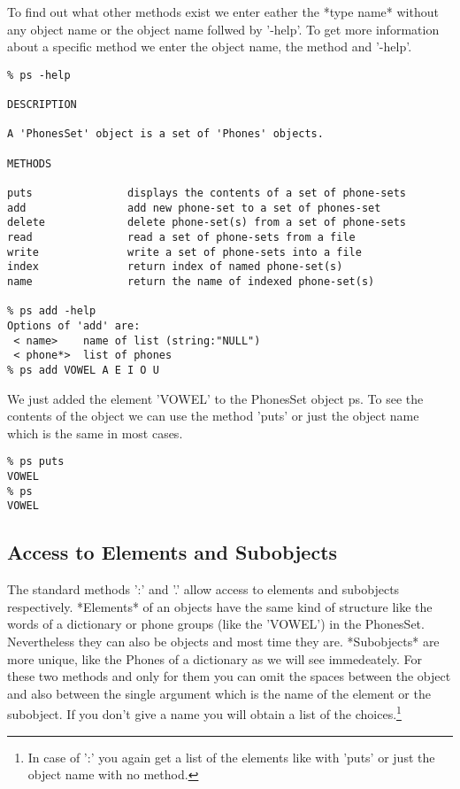 To find out what other methods exist we enter eather the *type name*
without any object name or the object name follwed by '-help'. To get
more information about a specific method we enter the object name, the
method and '-help'.

\begin{verbatim}
% ps -help

DESCRIPTION

A 'PhonesSet' object is a set of 'Phones' objects.

METHODS

puts               displays the contents of a set of phone-sets
add                add new phone-set to a set of phones-set
delete             delete phone-set(s) from a set of phone-sets
read               read a set of phone-sets from a file
write              write a set of phone-sets into a file
index              return index of named phone-set(s)
name               return the name of indexed phone-set(s)

% ps add -help
Options of 'add' are:
 < name>    name of list (string:"NULL")
 < phone*>  list of phones
% ps add VOWEL A E I O U
\end{verbatim}

We just added the element 'VOWEL' to the PhonesSet object ps. To see the
contents of the object we can use the method 'puts' or just the object
name which is the same in most cases.

\begin{verbatim}
% ps puts 
VOWEL
% ps
VOWEL
\end{verbatim}

\subsection*{Access to Elements and Subobjects}

The standard methods ':' and '.' allow access to elements and subobjects
respectively. *Elements* of an objects have the same kind of structure
like the words of a dictionary or phone groups (like the 'VOWEL') in the
PhonesSet. Nevertheless they can also be objects and most time they are.
*Subobjects* are more unique, like the Phones of a dictionary as we will
see immedeately. For these two methods and only for them you can omit
the spaces between the object and also between the single argument which
is the name of the element or the subobject. If you don't give a name
you will obtain a list of the choices.\footnote{In case of ':' you again 
get a list of the elements like with 'puts' or just the object name with 
no method.}

